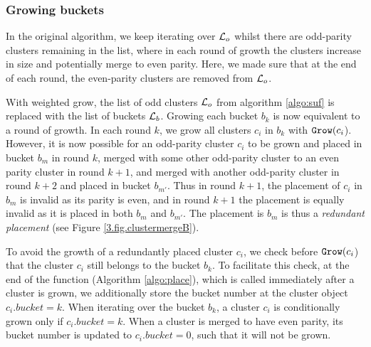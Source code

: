 

\subsubsection{Growing buckets}

In the original algorithm, we keep iterating over $\mathcal{L}_o$ whilst there are odd-parity clusters remaining in the list, where in each round of growth the clusters increase in size and potentially merge to even parity. Here, we made sure that at the end of each round, the even-parity clusters are removed from $\mathcal{L}_o$. 

With weighted grow, the list of odd clusters $\mathcal{L}_o$ from algorithm \ref{algo:suf} is replaced with the list of buckets $\mathcal{L}_b$. Growing each bucket $b_k$ is now equivalent to a round of growth. In each round $k$, we grow all clusters $c_i$ in $b_k$ with $\texttt{Grow}(c_i$). However, it is now possible for an odd-parity cluster $c_i$ to be grown and placed in bucket $b_m$ in round $k$, merged with some other odd-parity cluster to an even parity cluster in round $k+1$, and merged with another odd-parity cluster in round $k+2$ and placed in bucket $b_{m'}$. Thus in round $k+1$, the placement of $c_i$ in $b_m$ is invalid as its parity is even, and in round $k+1$ the placement is equally invalid as it is placed in both $b_m$ and $b_{m'}$. The placement is $b_m$ is thus a \emph{redundant placement} (see Figure \ref{3.fig.clustermergeB}).

To avoid the growth of a redundantly placed cluster $c_i$, we check before $\texttt{Grow}(c_i$) that the cluster $c_i$ still belongs to the bucket $b_k$. To facilitate this check, at the end of the function  (Algorithm \ref{algo:place}), which is called immediately after a cluster is grown, we additionally store the bucket number at the cluster object $c_i.bucket = k$. When iterating over the bucket $b_k$, a cluster $c_i$ is conditionally grown only if $c_i.bucket = k$. When a cluster is merged to have even parity, its bucket number is updated to $c_i.bucket=0$, such that it will not be grown.  

